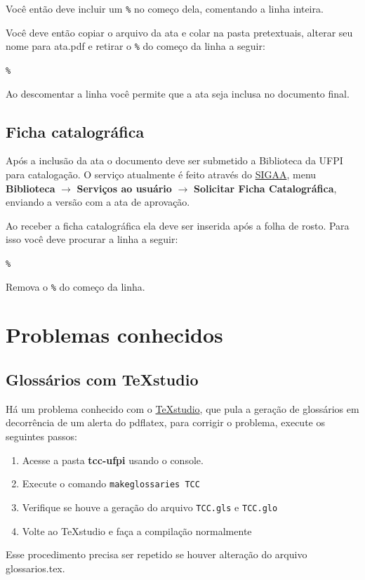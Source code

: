 Você então deve incluir um \verb|%| no começo dela, comentando a linha inteira.

Você deve então copiar o arquivo da ata e colar na pasta pretextuais, alterar seu nome para ata.pdf e retirar o \verb|%| do começo da linha a seguir:  
\par\verb|% | \par
Ao descomentar a linha você permite que a ata seja inclusa no documento final. 

\subsection{Ficha catalográfica}

Após a inclusão da ata o documento deve ser submetido a Biblioteca da UFPI para catalogação. O serviço atualmente é feito através do \href{http://sigaa.ufpi.br}{SIGAA}, menu \textbf{Biblioteca} $\rightarrow$ \textbf{Serviços ao usuário} $\rightarrow$ \textbf{Solicitar Ficha Catalográfica}, enviando a versão com a ata de aprovação. 

Ao receber a ficha catalográfica ela deve ser inserida após a folha de rosto. Para isso você deve procurar a linha a seguir: 
\par\verb|% | \par
Remova o \verb|%| do começo da linha. 

\section{Problemas conhecidos}

\subsection{Glossários com TeXstudio}
Há um problema conhecido com o \href{https://www.texstudio.org/}{TeXstudio}, que pula a geração de glossários em decorrência de um alerta do pdflatex, para corrigir o problema, execute os seguintes passos:

\begin{enumerate}
	\item Acesse a pasta \textbf{tcc-ufpi} usando o console.
	\item Execute o comando \verb|makeglossaries TCC|
	\item Verifique se houve a geração do arquivo \verb|TCC.gls| e \verb|TCC.glo|
	\item Volte ao TeXstudio e faça a compilação normalmente 
\end{enumerate}

Esse procedimento precisa ser repetido se houver alteração do arquivo glossarios.tex.


